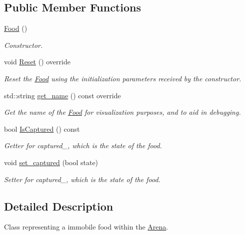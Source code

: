 \subsection*{Public Member Functions}
\begin{DoxyCompactItemize}
\item 
\mbox{\hyperlink{class_food_a75d4d7f76fd495cc8133302ca9fdc485}{Food}} ()
\begin{DoxyCompactList}\small\item\em Constructor. \end{DoxyCompactList}\item 
\mbox{\label{class_food_a1a12bfd50400e04b595c24a512317c1a}} 
void \mbox{\hyperlink{class_food_a1a12bfd50400e04b595c24a512317c1a}{Reset}} () override
\begin{DoxyCompactList}\small\item\em Reset the \mbox{\hyperlink{class_food}{Food}} using the initialization parameters received by the constructor. \end{DoxyCompactList}\item 
std\+::string \mbox{\hyperlink{class_food_a5c3bcd5109750a15ebb24b8a2a3cdd07}{get\+\_\+name}} () const override
\begin{DoxyCompactList}\small\item\em Get the name of the \mbox{\hyperlink{class_food}{Food}} for visualization purposes, and to aid in debugging. \end{DoxyCompactList}\item 
bool \mbox{\hyperlink{class_food_a81c160e9e591b4a4eb9662efb7130ee8}{Is\+Captured}} () const
\begin{DoxyCompactList}\small\item\em Getter for captured\+\_\+, which is the state of the food. \end{DoxyCompactList}\item 
\mbox{\label{class_food_a1ad8a3c17f9ab764215320ec11c7c40d}} 
void \mbox{\hyperlink{class_food_a1ad8a3c17f9ab764215320ec11c7c40d}{set\+\_\+captured}} (bool state)
\begin{DoxyCompactList}\small\item\em Setter for captured\+\_\+, which is the state of the food. \end{DoxyCompactList}\end{DoxyCompactItemize}


\subsection{Detailed Description}
Class representing a immobile food within the \mbox{\hyperlink{class_arena}{Arena}}. 

